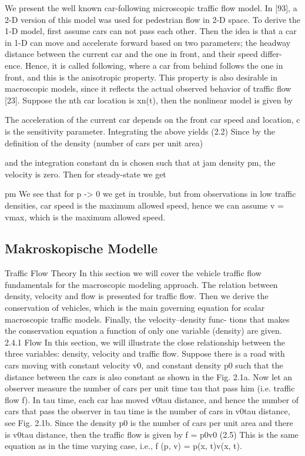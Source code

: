 \documentclass[journal=jacsat,manuscript=article]{achemso}
\begin{document}
We present the well known car-following microscopic traffic flow model. In [93], a 2-D version of this model was used for pedestrian flow in 2-D space. To derive the 1-D model, first assume cars can not pass each other. Then the idea is that a car in 1-D can move and accelerate forward based on two parameters; the headway distance between the current car and the one in front, and their speed differ- ence. Hence, it is called following, where a car from behind follows the one in front, and this is the anisotropic property. This property is also desirable in macroscopic models, since it reflects the actual observed behavior of traffic flow [23].
Suppose the nth car location is xn(t), then the nonlinear model is given by

The acceleration of the current car depends on the front car speed and location, c is the sensitivity parameter. Integrating the above yields
 (2.2) Since by the definition of the density (number of cars per unit area)

and the integration constant dn is chosen such that at jam density
pm, the velocity is zero. Then for steady-state we get

pm
We see that for p -> 0 we get in trouble, but from observations in low traffic densities, car speed is the maximum allowed speed, hence we can assume v = vmax, which is the maximum allowed speed.

\subsection*{Makroskopische Modelle}
Traffic Flow Theory
In this section we will cover the vehicle traffic flow fundamentals for the macroscopic modeling approach. The relation between density, velocity and flow is presented for traffic flow. Then we derive the conservation of vehicles, which is the main governing equation for scalar macroscopic traffic models. Finally, the velocity–density func- tions that makes the conservation equation a function of only one variable (density) are given.
2.4.1 Flow
In this section, we will illustrate the close relationship between the three variables: density, velocity and traffic flow. Suppose there is a road with cars moving with constant velocity v0, and constant density p0 such that the distance between the cars is also constant as shown in the Fig. 2.1a. Now let an observer measure the number of cars per unit time tau that pass him (i.e. traffic flow f). In tau time, each car has moved v0tau distance, and hence the number of cars that pass the observer in tau time is the number of cars in v0tau distance, see Fig. 2.1b.
Since the density p0 is the number of cars per unit area and there is v0tau distance, then the traffic flow is given by
f = p0v0 (2.5) This is the same equation as in the time varying case, i.e.,
f (p, v) = p(x, t)v(x, t).
\end{document}
